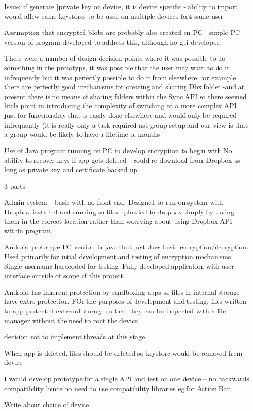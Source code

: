 Issue: if generate [private key on device, it is device specific - ability to import would allow same keystores to be used on multiple devices for4 same user

Assumption that encrypted blobs are probably also created on PC - simple PC version of program developed to address this, although no gui developed

There were a number of design decision points where it was possible to do something in the prototype, it was possible that the user may want to do it infrequently but it was perfectly possible to do it from elsewhere, for example there are perfectly good mechanisms for creating and sharing Dbx folder  -and at present there is no means of sharing folders within the Sync API so there seemed little point in introducing the complexity of switching to a more complex API just for functionality that is easily done elsewhere and would only be required infrequently (it is really only a task required ast group setup and our view is that a group would be likely to have a lifetime of months

Use of Java program running on PC to develop encryption to begin with
No ability to recover keys if app gets deleted - could re download from Dropbox as long as private key and certificate backed up. 

3 parts

Admin system – basic with no front end.  Designed to run on system with Dropbox installed and running so files uploaded to dropbox simply by saving them in the correct location rather than worrying about using Dropbox API within program.

	Android prototype
	PC version in java that just does basic encryption/decryption.  Used primarily for intial development and testing of encryption mechanisms. Single username hardcoded for testing. Fully developed application with user interface outside of scope of this project.
	
	Android has inherent protection by sandboxing apps so files in internal storage have extra protection. FOr the purposes of development and testing, files written to app protected external storage so that they can be inspected with a file manager without the need to root the device

decision not to implement threads at this stage

When app is deleted, files should be deleted so keystore would be removed from device

I would develop prototype for a single API and test on one device – no backwards compatibility hence no need to use compatibility libraries eg for Action Bar

Write about choice of device